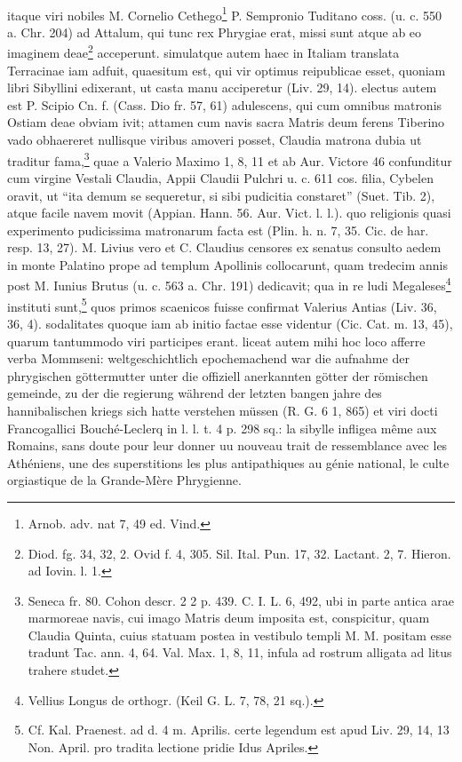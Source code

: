 \documentclass[a4paper, 11pt, oneside, polutonikogreek, german, twocolumn]{article}
\begin{document}
\paragraph{}
itaque viri nobiles M. Cornelio Cethego\footnote{Arnob. adv. nat 7, 49 ed. Vind.} P. Sempronio Tuditano coss. (u. c. 550 a. Chr. 204) ad Attalum, qui tunc rex Phrygiae erat, missi sunt atque ab eo imaginem deae\footnote{Diod. fg. 34, 32, 2. Ovid f. 4, 305. Sil. Ital. Pun. 17, 32. Lactant. 2, 7. Hieron. ad Iovin. l. 1.} acceperunt. simulatque autem haec in Italiam translata Terracinae iam adfuit, quaesitum est, qui vir optimus reipublicae esset, quoniam libri Sibyllini edixerant, ut casta manu acciperetur (Liv. 29, 14). electus autem est P. Scipio Cn. f. (Cass. Dio fr. 57, 61) adulescens, qui cum omnibus matronis Ostiam deae obviam ivit; attamen cum navis sacra Matris deum ferens Tiberino vado obhaereret nullisque viribus amoveri posset, Claudia matrona dubia ut traditur fama,\footnote{Seneca fr. 80. Cohon descr. 2 2 p. 439. C. I. L. 6, 492, ubi in parte antica arae marmoreae navis, cui imago Matris deum imposita est, conspicitur, quam Claudia Quinta, cuius statuam postea in vestibulo templi M. M. positam esse tradunt Tac. ann. 4, 64. Val. Max. 1, 8, 11, infula ad rostrum alligata ad litus trahere studet.} quae a Valerio Maximo 1, 8, 11 et ab Aur. Victore 46 confunditur cum virgine Vestali Claudia, Appii Claudii Pulchri u. c. 611 cos. filia, Cybelen oravit, ut "`ita demum se sequeretur, si sibi pudicitia constaret"' (Suet. Tib. 2), atque facile navem movit (Appian. Hann. 56. Aur. Vict. l. l.). quo religionis quasi experimento pudicissima matronarum facta est (Plin. h. n. 7, 35. Cic. de har. resp. 13, 27). M. Livius vero et C. Claudius censores ex senatus consulto aedem in monte Palatino prope ad templum Apollinis collocarunt, quam tredecim annis post M. Iunius Brutus (u. c. 563 a. Chr. 191) dedicavit; qua in re ludi Megaleses\footnote{Vellius Longus de orthogr. (Keil G. L. 7, 78, 21 sq.).} instituti sunt,\footnote{Cf. Kal. Praenest. ad d. 4 m. Aprilis. certe legendum est apud Liv. 29, 14, 13 Non. April. pro tradita lectione pridie Idus Apriles.} quos primos scaenicos fuisse confirmat Valerius Antias (Liv. 36, 36, 4). sodalitates quoque iam ab initio factae esse videntur (Cic. Cat. m. 13, 45), quarum tantummodo viri participes erant. liceat autem mihi hoc loco afferre verba Mommseni: weltgeschichtlich epochemachend war die aufnahme der phrygischen göttermutter unter die offiziell anerkannten götter der römischen gemeinde, zu der die regierung während der letzten bangen jahre des hannibalischen kriegs sich hatte verstehen müssen (R. G. 6 1, 865) et viri docti Francogallici Bouché-Leclerq in l. l. t. 4 p. 298 sq.: la sibylle infligea même aux Romains, sans doute pour leur donner uu nouveau trait de ressemblance avec les Athéniens, une des superstitions les plus antipathiques au génie national, le culte orgiastique de la Grande-Mère Phrygienne.
\end{document}
